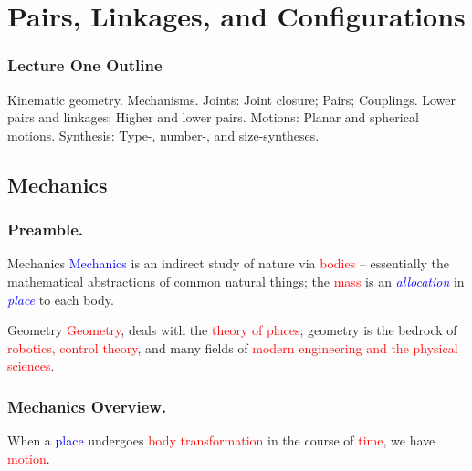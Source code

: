 \section{Pairs, Linkages, and Configurations}

\begin{frame}
	\frametitle{Lecture One Outline}
	\begin{tcolorbox}[coltitle=white!80,colframe=blue!85,split=.2,title=Mechanism Components]
		Kinematic geometry. Mechanisms.
		\tcblower
		Joints: Joint closure; Pairs; Couplings.
		\vspace{.2cm}
		\newline
		Lower pairs and linkages; Higher and lower pairs.
		\vspace{.2cm}
		\newline
		Motions: Planar and spherical motions.
		\vspace{.2cm}
		\newline
		Synthesis: Type-, number-, and size-syntheses.
	\end{tcolorbox}
\end{frame}

\subsection{Mechanics}
\begin{frame}
	\frametitle{Preamble.}
	\begin{block}{Mechanics}
		\textcolor{blue}{Mechanics} is an indirect study of nature via \textcolor{red}{bodies} --  essentially the mathematical abstractions of common natural things; the \textcolor{red}{mass} is an \textcolor{blue}{\textit{allocation}} in \textcolor{blue}{\textit{place}} to each body.
	\end{block}

	\begin{block}{Geometry}
		 \textcolor{red}{Geometry}, deals with the \textcolor{red}{theory of places}; geometry is the bedrock of \textcolor{red}{robotics, control theory}, and many fields of \textcolor{red}{modern engineering and the physical sciences}.
\end{block}
\end{frame}

\begin{frame}
	\frametitle{Mechanics Overview.}
	\begin{definition}[Motion]
		When a  \textcolor{blue}{place} undergoes \textcolor{red}{body transformation} in the course of  \textcolor{red}{time}, we have \textcolor{red}{motion}.
	\end{definition}
\end{frame}

